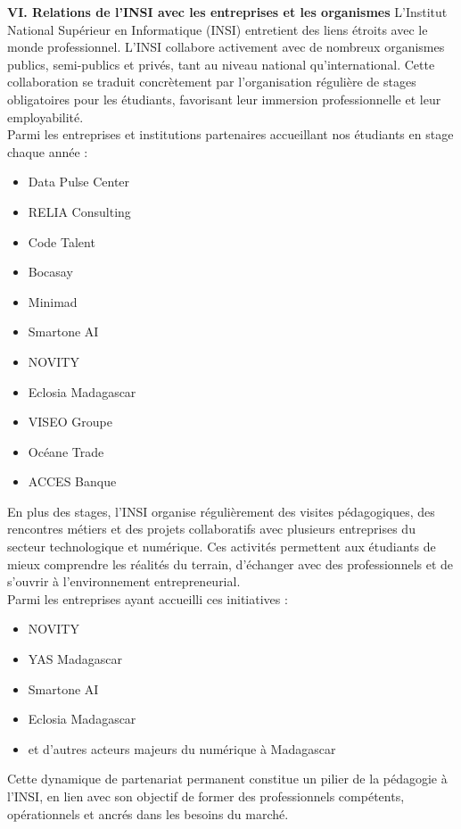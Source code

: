 \documentclass[a4paper,12pt]{book}
\begin{document}
\textbf{VI. Relations de l’INSI avec les entreprises et les organismes} 
L’Institut National Supérieur en Informatique (INSI) entretient des liens étroits avec le monde professionnel. L’INSI collabore activement avec de nombreux organismes publics, semi-publics et privés, tant au niveau national qu’international. Cette collaboration se traduit concrètement par l’organisation régulière de stages obligatoires pour les étudiants, favorisant leur immersion professionnelle et leur employabilité.\\

Parmi les entreprises et institutions partenaires accueillant nos étudiants en stage chaque année :
\begin{itemize}
    \item Data Pulse Center
    \item RELIA Consulting
    \item Code Talent
    \item Bocasay
    \item Minimad
    \item Smartone AI
    \item NOVITY
    \item Eclosia Madagascar
    \item VISEO Groupe
    \item Océane Trade
    \item ACCES Banque
\end{itemize}

En plus des stages, l’INSI organise régulièrement des visites pédagogiques, des rencontres métiers et des projets collaboratifs avec plusieurs entreprises du secteur technologique et numérique. Ces activités permettent aux étudiants de mieux comprendre les réalités du terrain, d’échanger avec des professionnels et de s’ouvrir à l’environnement entrepreneurial.\\

Parmi les entreprises ayant accueilli ces initiatives :
\begin{itemize}
    \item NOVITY
    \item YAS Madagascar
    \item Smartone AI
    \item Eclosia Madagascar
    \item et d'autres acteurs majeurs du numérique à Madagascar
\end{itemize}

Cette dynamique de partenariat permanent constitue un pilier de la pédagogie à l’INSI, en lien avec son objectif de former des professionnels compétents, opérationnels et ancrés dans les besoins du marché.\\
\end{document}
